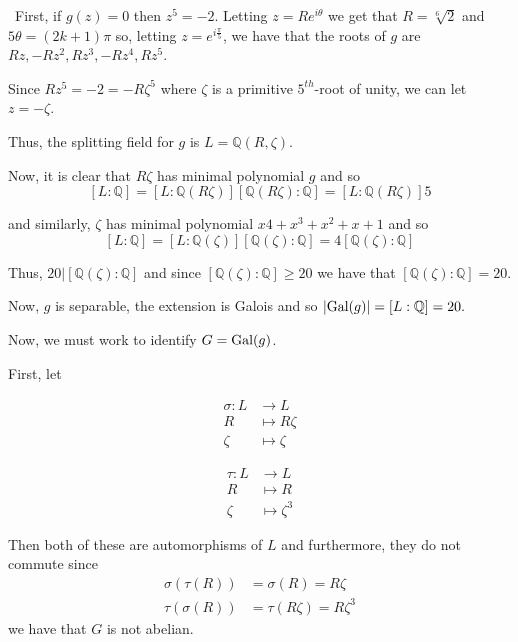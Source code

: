 \documentclass[12pt]{Qual}
\begin{document}
\begin{solution}$\,$
First, if $g(z)=0$ then $z^5=-2$. Letting $z=Re^{i\theta}$ we get that $R=\sqrt[6]{2}$ and $5\theta=(2k+1)\pi$ so, letting $z=e^{i\frac{\pi}{5}}$, we have that the roots of $g$ are $Rz,-Rz^2,Rz^3,-Rz^4,Rz^5$.

Since $Rz^5=-2=-R\zeta^5$ where $\zeta$ is a primitive $5^{th}$-root of unity, we can let $z=-\zeta$.

Thus, the splitting field for $g$ is $L=\mathbb{Q}(R,\zeta)$.

Now, it is clear that $R\zeta$ has minimal polynomial $g$ and so $$[L:\mathbb{Q}]=[L:\mathbb{Q}(R\zeta)][\mathbb{Q}(R\zeta):\mathbb{Q}]=[L:\mathbb{Q}(R\zeta)]5$$

and similarly, $\zeta$ has minimal polynomial $x4+x^3+x^2+x+1$ and so $$[L:\mathbb{Q}]=[L:\mathbb{Q}(\zeta)][\mathbb{Q}(\zeta):\mathbb{Q}]=4[\mathbb{Q}(\zeta):\mathbb{Q}]$$

Thus, $20|[\mathbb{Q}(\zeta):\mathbb{Q}]$ and since $[\mathbb{Q}(\zeta):\mathbb{Q}]\ge20$ we have that $[\mathbb{Q}(\zeta):\mathbb{Q}]=20.$

Now, $g$ is separable, the extension is Galois and so $|\text{Gal}(g)|=[L:\mathbb{Q}]=20.$

Now, we must work to identify $G=\text{Gal}(g)$.

First, let
\begin{center}
 \begin{minipage}{.3\textwidth}
        \centering
    \begin{align*}
    \sigma:L&\to L\\
    R&\mapsto R\zeta\\
    \zeta&\mapsto \zeta
\end{align*}
\end{minipage}%
\begin{minipage}{.3\textwidth}
        \centering
\begin{align*}
    \tau:L&\to L\\
    R&\mapsto R\\
    \zeta&\mapsto \zeta^3
\end{align*}
\end{minipage}
\end{center}

Then both of these are automorphisms of $L$ and furthermore, they do not commute since \begin{align*}
    \sigma(\tau(R))&=\sigma(R)=R\zeta\\
    \tau(\sigma(R))&=\tau(R\zeta)=R\zeta^3
\end{align*} we have that $G$ is not abelian.


\end{solution}
\end{document}
